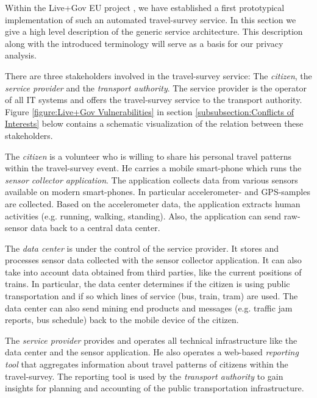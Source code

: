 \documentclass[runningheads,a4paper]{llncs}
\begin{document}
Within the Live+Gov EU project \cite{LiveGov:Prog}, we have established a first
prototypical implementation of such an automated travel-survey
service. In this section we give a high level description of the
generic service architecture. This description along with the
introduced terminology will serve as a basis for our privacy analysis.

There are three stakeholders involved in the travel-survey service:
The \emph{citizen}, the \emph{service provider} and the \emph{transport
  authority}. The service provider is the operator of all IT systems and
offers the travel-survey service to the transport authority. Figure
\ref{figure:Live+Gov Vulnerabilities} in section \ref{subsubsection:Conflicts of Interests} below contains a schematic
visualization of the relation between these stakeholders.

The \emph{citizen} is a volunteer who is willing to share his personal travel
patterns within the travel-survey event.  He carries a mobile
smart-phone which runs the \emph{sensor collector application}. The
application collects data from various sensors available on modern
smart-phones. In particular accelerometer- and GPS-samples are
collected. Based on the accelerometer data, the application extracts
human activities (e.g. running, walking, standing). Also, the
application can send raw-sensor data back to a central data center.

The \emph{data center} is under the control of the service provider. It 
stores and processes sensor data collected with
the sensor collector application. It can also take into account data
obtained from third parties, like the current positions of trains. In
particular, the data center determines if the citizen is using public
transportation and if so which lines of service (bus, train, tram) are
used. The data center can also send mining end products and messages
(e.g. traffic jam reports, bus schedule) back to the mobile device of
the citizen.

The \emph{service provider} provides and operates all technical
infrastructure like the data center and the sensor application. He
also operates a web-based \emph{reporting tool} that aggregates
information about travel patterns of citizens within the
travel-survey. The reporting tool is used by the \emph{transport authority} to gain
insights for planning and accounting of the public transportation
infrastructure.





\end{document}
